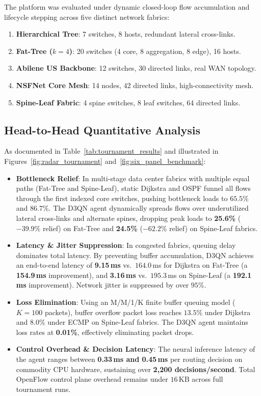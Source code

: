 \documentclass[10pt,twocolumn,a4paper]{article}
\begin{document}
The platform was evaluated under dynamic closed-loop flow accumulation and lifecycle stepping across five distinct network fabrics:
\begin{enumerate}[leftmargin=*,itemsep=1pt,topsep=2pt]
    \item \textbf{Hierarchical Tree}: 7 switches, 8 hosts, redundant lateral cross-links.
    \item \textbf{Fat-Tree ($k=4$)}: 20 switches (4 core, 8 aggregation, 8 edge), 16 hosts.
    \item \textbf{Abilene US Backbone}: 12 switches, 30 directed links, real WAN topology.
    \item \textbf{NSFNet Core Mesh}: 14 nodes, 42 directed links, high-connectivity mesh.
    \item \textbf{Spine-Leaf Fabric}: 4 spine switches, 8 leaf switches, 64 directed links.
\end{enumerate}

\subsection{Head-to-Head Quantitative Analysis}
As documented in Table~\ref{tab:tournament_results} and illustrated in Figures~\ref{fig:radar_tournament} and~\ref{fig:six_panel_benchmark}:

\begin{itemize}[leftmargin=*,itemsep=2pt,topsep=2pt]
    \item \textbf{Bottleneck Relief}: In multi-stage data center fabrics with multiple equal paths (Fat-Tree and Spine-Leaf), static Dijkstra and OSPF funnel all flows through the first indexed core switches, pushing bottleneck loads to $65.5\%$ and $86.7\%$. The D3QN agent dynamically spreads flows over underutilized lateral cross-links and alternate spines, dropping peak loads to \textbf{25.6\%} ($-39.9\%$ relief) on Fat-Tree and \textbf{24.5\%} ($-62.2\%$ relief) on Spine-Leaf fabrics.
    \item \textbf{Latency \& Jitter Suppression}: In congested fabrics, queuing delay dominates total latency. By preventing buffer accumulation, D3QN achieves an end-to-end latency of \textbf{9.15\,ms} vs.\ $164.0$\,ms for Dijkstra on Fat-Tree (a \textbf{154.9\,ms} improvement), and \textbf{3.16\,ms} vs.\ $195.3$\,ms on Spine-Leaf (a \textbf{192.1\,ms} improvement). Network jitter is suppressed by over $95\%$.
    \item \textbf{Loss Elimination}: Using an M/M/1/K finite buffer queuing model ($K=100$ packets), buffer overflow packet loss reaches $13.5\%$ under Dijkstra and $8.0\%$ under ECMP on Spine-Leaf fabrics. The D3QN agent maintains loss rates at \textbf{0.01\%}, effectively eliminating packet drops.
    \item \textbf{Control Overhead \& Decision Latency}: The neural inference latency of the agent ranges between \textbf{0.33\,ms and 0.45\,ms} per routing decision on commodity CPU hardware, sustaining over \textbf{2,200 decisions/second}. Total OpenFlow control plane overhead remains under $16$\,KB across full tournament runs.
\end{itemize}
\end{document}
